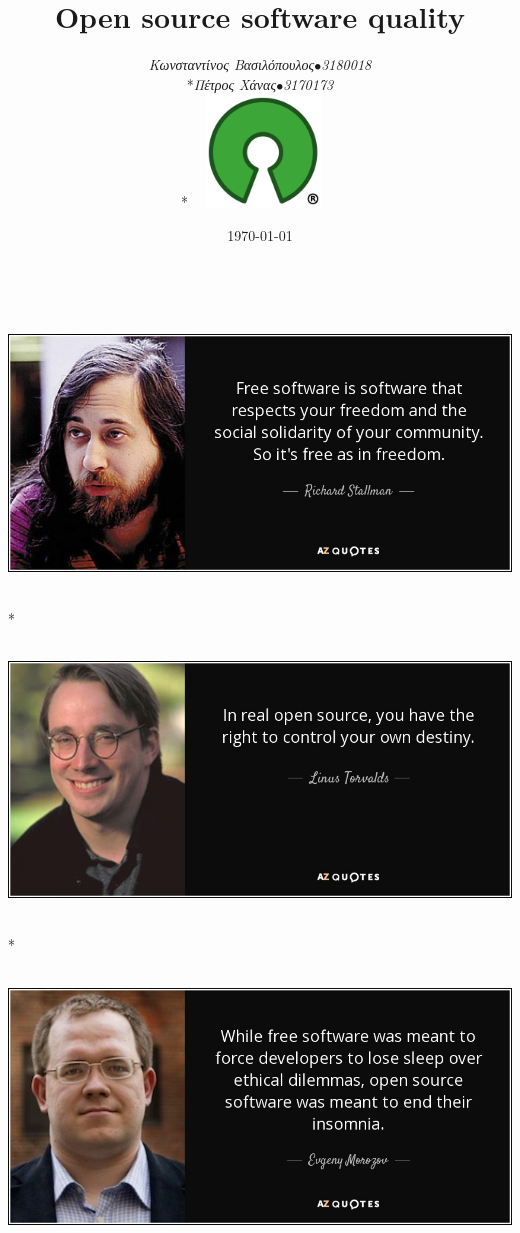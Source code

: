 \documentclass[a4paper, 11pt]{article}
\title{\textbf{\textlatin{ Open source software quality}}}
\author{{\textit{Κωνσταντίνος Βασιλόπουλος\(\bullet\)3180018}\\*\textit{Πέτρος Χάνας\(\bullet\)3170173}}\\*\includegraphics[width=4cm, height=3cm]{oSource}}
\date{\today}
\begin{document}

\newpage
\thispagestyle{plain} %
\mbox{}
\includegraphics[width=15cm, height=8cm]{images/stallman.jpg}\\*
\includegraphics[width=15cm, height=8cm]{images/linus.jpg}\\*
\includegraphics[width=15cm, height=8cm]{images/insomnia quote.jpg}
\maketitle
\end{document}
